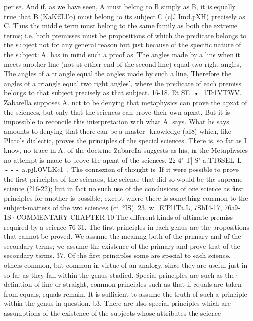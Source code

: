 {{{{{{{{{{{{{{per se. And if, as we have seen, A must belong to B simply as B,
it is equally true that B (KaK€Ll'o) must belong to its subject C
(c[J Imd.pXH) precisely as C. Thus the middle term must belong
to the same family as both the extreme terms; i.e. both premisses
must be propositions of which the predicate belongs to the
subject not for any general reason but just because of the specific
nature of the subject: A. has in mind such a proof as 'The angles
made by a line when it meets another line (not at either end of
the second line) equal two right angles, The angles of a triangle
equal the angles made by such a line, Therefore the angles of a
triangle equal two right angles', where the predicate of each
premiss belongs to that subject precisely as that subject.
16-18. Et SE .•. 1Tc1VTWV. Zabarella supposes A. not to be
denying that metaphysics can prove the apxat of the sciences,
but only that the sciences can prove their own apxat. But it is
impossible to reconcile this interpretation with what A. says.
What he says amounts to denying that there can be a master-
knowledge (aI8) which, like Plato's dialectic, proves the principles
of the special sciences. There is, so far as I know, no trace in A.
of the doctrine Zabarella suggests as his; in the Metaphysics no
attempt is made to prove the apxat of the sciences.
22-4' T] S' a:TT6SEL~L~ ••• a.pjl.OVLKc1~. The connexion of thought
is: If it were possible to prove the first principles of the sciences,
the science that did so would be the supreme science (°16-22);
but in fact no such use of the conclusions of one science as first
principles for another is possible, except where there is something
common to the subject-matters of the two sciences (cf. °IS).
23. w~ E'{Pl1Ta.L, 7SbI4-17, 76a9-1S·COMMENTARY
CHAPTER 10
The different kinds of ultimate premiss required by a science
76-31. The first principles in each genus are the propositions
that cannot be proved. We assume the meaning both of the
primary and of the secondary terms; we assume the existence
of the primary and prove that of the secondary terms.
37. Of the first principles some are special to each science,
others common, but common in virtue of an analogy, since they
are useful just in so far as they fall within the genus studied.
Special principles are such as the· definition of line or straight,
common principles such as that if equals are taken from equals,
equals remain. It is sufficient to assume the truth of such a
principle within the genus in question.
b3. There are also special principles which are assumptions
of the existence of the subjects whose attributes the science
}}}}}}}}}}}}}}}

